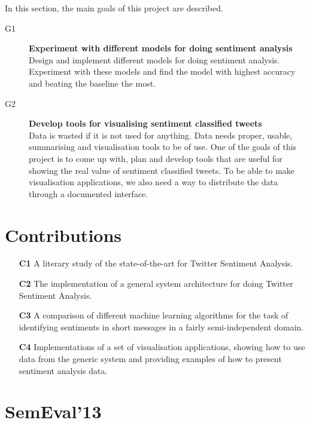 In this section, the main goals of this project are described.

\begin{description}

\item[G1] \textbf{Experiment with different models for doing sentiment analysis} \\
	Design and implement different models for doing sentiment analysis. Experiment with these models and find the model with highest accuracy and beating the baseline the most. 
	
\item[G2] \textbf{Develop tools for visualising sentiment classified tweets} \\
    Data is wasted if it is not used for anything. Data needs proper, usable, summarising and visualisation tools to be of use. One of the goals of this project is to come up with, plan and develop tools that are useful for showing the real value of sentiment classified tweets. To be able to make visualisation applications, we also need a way to distribute the data through a documented interface. 

\end{description}

\section{Contributions}
\label{sec:contribution}

\begin{itemize}
\item[\textbf{C1}] A literary study of the state-of-the-art for Twitter Sentiment Analysis. 

\item[\textbf{C2}] The implementation of a general system architecture for doing Twitter Sentiment Analysis. 

\item[\textbf{C3}] A comparison of different machine learning algorithms for the task of identifying sentiments in short messages in a fairly semi-independent domain.

\item[\textbf{C4}] Implementations of a set of visualisation applications, showing how to use data from the generic system and providing examples of how to present sentiment analysis data.
\end{itemize}

\section{SemEval'13}
\label{sec:semevalintro}

